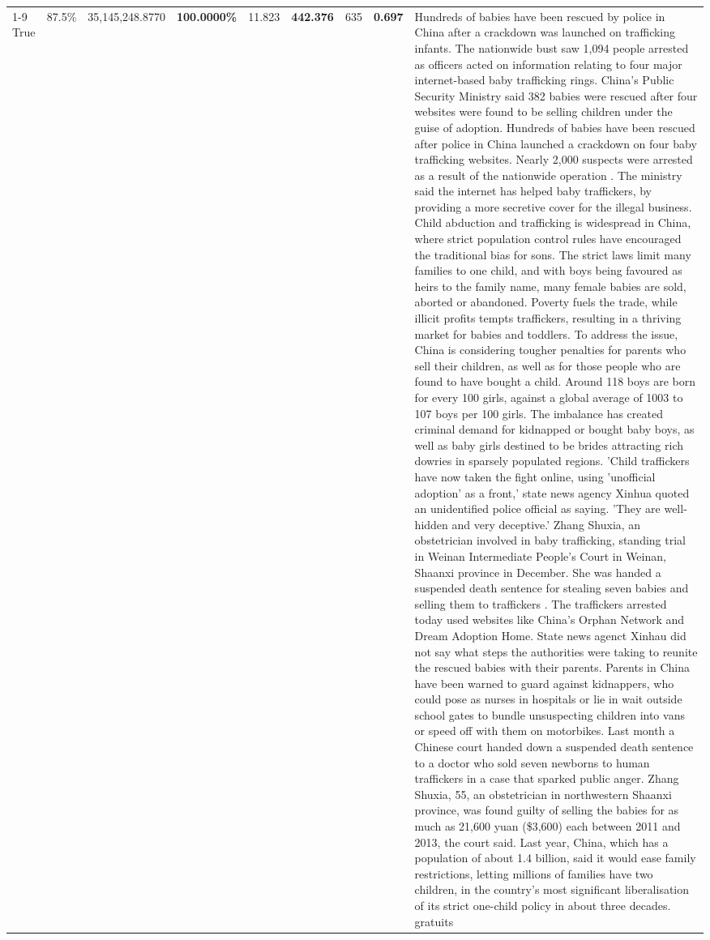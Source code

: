 \begin{table}[H]
\begin{tabular}{lllrlllll}
\cline{1-9}
True & 87.5\% & 35,145,248.8770 & \bfseries \color{red} 100.0000\% & 11.823 & \bfseries \color{red} 442.376 & 635 & \bfseries \color{red} 0.697 & Hundreds of babies have been rescued by police in China after a crackdown was launched on trafficking infants. The nationwide bust saw 1,094 people arrested as officers acted on information relating to four major internet-based baby trafficking rings. China's Public Security Ministry said 382 babies were rescued after four websites were found to be selling children under the guise of adoption. Hundreds of babies have been rescued after police in China launched a crackdown on four baby trafficking websites. Nearly 2,000 suspects were arrested as a result of the nationwide operation . The ministry said the internet has helped baby traffickers, by providing a more secretive cover for the illegal business. Child abduction and trafficking is widespread in China, where strict population control rules have encouraged the traditional bias for sons. The strict laws limit many families to one child, and with boys being favoured as heirs to the family name, many female babies are sold, aborted or abandoned. Poverty fuels the trade, while illicit profits tempts traffickers, resulting in a thriving market for babies and toddlers. To address the issue, China is considering tougher penalties for parents who sell their children, as well as for those people who are found to have bought a child. Around 118 boys are born for every 100 girls, against a global average of 1003 to 107 boys per 100 girls. The imbalance has created criminal demand for kidnapped or bought baby boys, as well as baby girls destined to be brides attracting rich dowries in sparsely populated regions. 'Child traffickers have now taken the fight online, using 'unofficial adoption' as a front,' state news agency Xinhua quoted an unidentified police official as saying. 'They are well-hidden and very deceptive.' Zhang Shuxia, an obstetrician involved in baby trafficking, standing trial in Weinan Intermediate People's Court in Weinan, Shaanxi province in December. She was handed a suspended death sentence for stealing seven babies and selling them to traffickers . The traffickers arrested today used websites like China's Orphan Network and Dream Adoption Home. State news agenct Xinhau did not say what steps the authorities were taking to reunite the rescued babies with their parents. Parents in China have been warned to guard against kidnappers, who could pose as nurses in hospitals or lie in wait outside school gates to bundle unsuspecting children into vans or speed off with them on motorbikes. Last month a Chinese court handed down a suspended death sentence to a doctor who sold seven newborns to human traffickers in a case that sparked public anger. Zhang Shuxia, 55, an obstetrician in northwestern Shaanxi province, was found guilty of selling the babies for as much as 21,600 yuan (\$3,600) each between 2011 and 2013, the court said. Last year, China, which has a population of about 1.4 billion, said it would ease family restrictions, letting millions of families have two children, in the country's most significant liberalisation of its strict one-child policy in about three decades. gratuits \\

\end{tabular}
\end{table}
